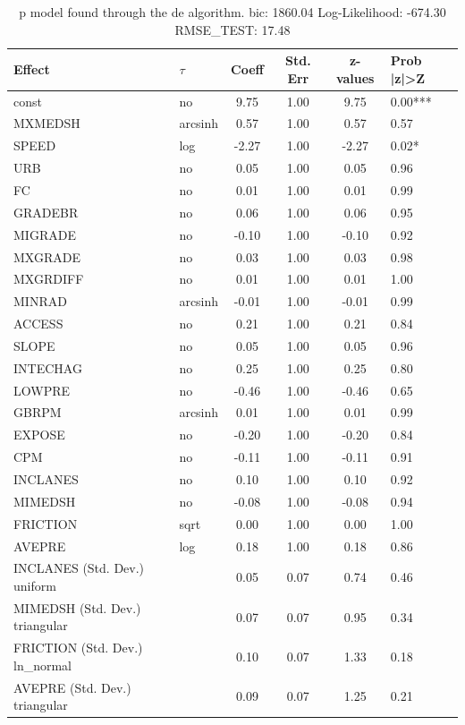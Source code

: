 \begin{table}
	\caption{p model found through the de algorithm. bic: 1860.04 Log-Likelihood: -674.30 RMSE_TEST: 17.48}
	\begin{center}
		\begin{tabular}{|l|l|c|c|c|l|}
			\hline
			Effect & $\tau$ & Coeff & Std. Err & z-values & Prob |z|>Z \\
			\hline
			const & no & 9.75 & 1.00 & 9.75 & 0.00*** \\
			\hline
			MXMEDSH & arcsinh & 0.57 & 1.00 & 0.57 & 0.57 \\
			\hline
			SPEED & log & -2.27 & 1.00 & -2.27 & 0.02* \\
			\hline
			URB & no & 0.05 & 1.00 & 0.05 & 0.96 \\
			\hline
			FC & no & 0.01 & 1.00 & 0.01 & 0.99 \\
			\hline
			GRADEBR & no & 0.06 & 1.00 & 0.06 & 0.95 \\
			\hline
			MIGRADE & no & -0.10 & 1.00 & -0.10 & 0.92 \\
			\hline
			MXGRADE & no & 0.03 & 1.00 & 0.03 & 0.98 \\
			\hline
			MXGRDIFF & no & 0.01 & 1.00 & 0.01 & 1.00 \\
			\hline
			MINRAD & arcsinh & -0.01 & 1.00 & -0.01 & 0.99 \\
			\hline
			ACCESS & no & 0.21 & 1.00 & 0.21 & 0.84 \\
			\hline
			SLOPE & no & 0.05 & 1.00 & 0.05 & 0.96 \\
			\hline
			INTECHAG & no & 0.25 & 1.00 & 0.25 & 0.80 \\
			\hline
			LOWPRE & no & -0.46 & 1.00 & -0.46 & 0.65 \\
			\hline
			GBRPM & arcsinh & 0.01 & 1.00 & 0.01 & 0.99 \\
			\hline
			EXPOSE & no & -0.20 & 1.00 & -0.20 & 0.84 \\
			\hline
			CPM & no & -0.11 & 1.00 & -0.11 & 0.91 \\
			\hline
			INCLANES & no & 0.10 & 1.00 & 0.10 & 0.92 \\
			\hline
			MIMEDSH & no & -0.08 & 1.00 & -0.08 & 0.94 \\
			\hline
			FRICTION & sqrt & 0.00 & 1.00 & 0.00 & 1.00 \\
			\hline
			AVEPRE & log & 0.18 & 1.00 & 0.18 & 0.86 \\
			\hline
			INCLANES (Std. Dev.) uniform &  & 0.05 & 0.07 & 0.74 & 0.46 \\
			\hline
			MIMEDSH (Std. Dev.) triangular &  & 0.07 & 0.07 & 0.95 & 0.34 \\
			\hline
			FRICTION (Std. Dev.) ln_normal &  & 0.10 & 0.07 & 1.33 & 0.18 \\
			\hline
			AVEPRE (Std. Dev.) triangular &  & 0.09 & 0.07 & 1.25 & 0.21 \\
			\hline
		\end{tabular}
	\end{center}
\end{table}